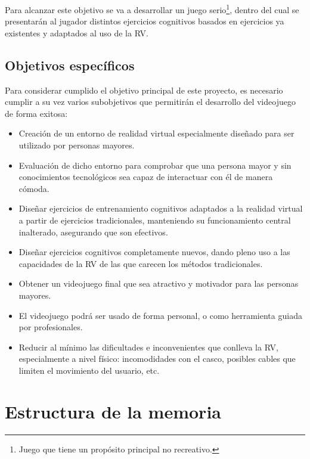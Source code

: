 Para alcanzar este objetivo se va a desarrollar un juego serio\footnote{Juego que tiene un propósito principal no recreativo.}, dentro del cual se presentarán al jugador distintos ejercicios cognitivos basados en ejercicios ya existentes y adaptados al uso de la RV.


\subsection{Objetivos específicos}

Para considerar cumplido el objetivo principal de este proyecto, es necesario cumplir a su vez varios subobjetivos que permitirán el desarrollo del videojuego de forma exitosa:


\begin{itemize}
	\item{Creación de un entorno de realidad virtual especialmente diseñado para ser utilizado por personas mayores.}

	\item{Evaluación de dicho entorno para comprobar que una persona mayor y sin conocimientos tecnológicos sea capaz de interactuar con él de manera cómoda.}

	\item{Diseñar ejercicios de entrenamiento cognitivos adaptados a la realidad virtual a partir de ejercicios tradicionales, manteniendo su funcionamiento central inalterado, asegurando que son efectivos.}

	\item{Diseñar ejercicios cognitivos completamente nuevos, dando pleno uso a las capacidades de la RV de las que carecen los métodos tradicionales.}

	\item{Obtener un videojuego final que sea atractivo y motivador para las personas mayores.}

	\item{El videojuego podrá ser usado de forma personal, o como herramienta guiada por profesionales.}

	\item{Reducir al mínimo las dificultades e inconvenientes que conlleva la RV, especialmente a nivel físico: incomodidades con el casco, posibles cables que limiten el movimiento del usuario, etc.}


\end{itemize}


\section{Estructura de la memoria}

